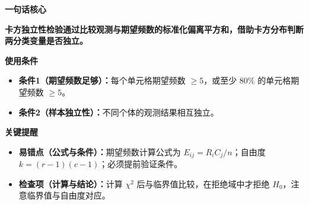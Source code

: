 \begin{summarybox}
	\textbf{\textcolor{CSummary}{一句话核心}}

	\textbf{卡方独立性检验通过比较观测与期望频数的标准化偏离平方和，借助卡方分布判断两分类变量是否独立。}

	\medskip
	\textbf{\textcolor{CSummary}{使用条件}}
	\begin{itemize}[leftmargin=*, itemsep=0.5em, topsep=0.4em]
		\item \textbf{条件1（期望频数足够）：}每个单元格期望频数 $\geq5$，或至少 $80\%$ 的单元格期望频数 $\geq5$。
		\item \textbf{条件2（样本独立性）：}不同个体的观测结果相互独立。
	\end{itemize}

	\medskip
	\textbf{\textcolor{CSummary}{关键提醒}}
	\begin{itemize}[leftmargin=*, itemsep=0.5em, topsep=0.4em]
		\item \textbf{易错点（公式与条件）：}期望频数计算公式为 $E_{ij}=R_iC_j/n$；自由度 $k=(r-1)(c-1)$；必须提前验证条件。
		\item \textbf{检查项（计算与结论）：}计算 $\chi^2$ 后与临界值比较，在拒绝域中才拒绝 $H_0$，注意临界值与自由度对应。
	\end{itemize}
\end{summarybox}

